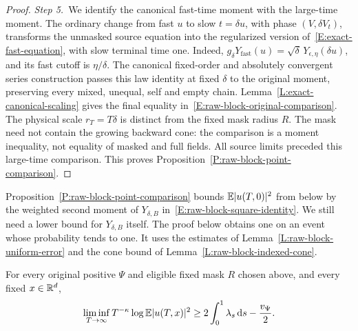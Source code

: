 \begin{proof}
  \medskip
  \noindent\textit{Step 5.~}We identify the canonical fast-time moment with
  the large-time moment.
  The ordinary change from fast $u$ to slow $t = \delta u$, with phase
  $(V,\delta V_t)$, transforms the unmasked source equation into the regularized
  version of~\eqref{E:exact-fast-equation}, with slow terminal time one. Indeed,
  $g_\delta Y_{\mathrm{fast}}(u) = \sqrt\delta\,Y_{\epsilon,\eta}(\delta u)$,
  and its fast cutoff is $\eta/\delta$. The canonical fixed-order and absolutely
  convergent series construction passes this law identity at fixed $\delta$ to
  the original moment, preserving every mixed, unequal, self and empty chain.
  Lemma~\ref{L:exact-canonical-scaling} gives the final equality
  in~\eqref{E:raw-block-original-comparison}. The physical scale $r_T = T\delta$
  is distinct from the fixed mask radius $R$. The mask need not contain the
  growing backward cone: the comparison is a moment inequality, not equality of
  masked and full fields. All source limits preceded this large-time comparison.
  This proves Proposition~\ref{P:raw-block-point-comparison}.
\end{proof}

Proposition~\ref{P:raw-block-point-comparison} bounds $\mathbb{E}|u(T,0)|^2$ from below
by the weighted second moment of $Y_{\delta,B}$
in~\eqref{E:raw-block-square-identity}. We still need a lower bound for
$Y_{\delta,B}$ itself. The proof below obtains one on an event whose probability
tends to one. It uses the estimates of Lemma~\ref{L:raw-block-uniform-error} and
the cone bound of Lemma~\ref{L:raw-block-indexed-cone}.

\begin{proposition}
  \label{P:raw-block-original-lower}
  For every original positive $\Psi$ and eligible fixed mask $R$ chosen above,
  and every fixed $x \in \mathbb{R}^d$,
  \begin{equation}\label{E:raw-block-original-lower}
    \liminf_{T\to\infty}T^{-\kappa}\log\mathbb{E}|u(T,x)|^2
    \ge 2\int_0^1\lambda_s\,\mathrm{d} s-\frac{v_\Psi}{2}.
  \end{equation}
\end{proposition}

